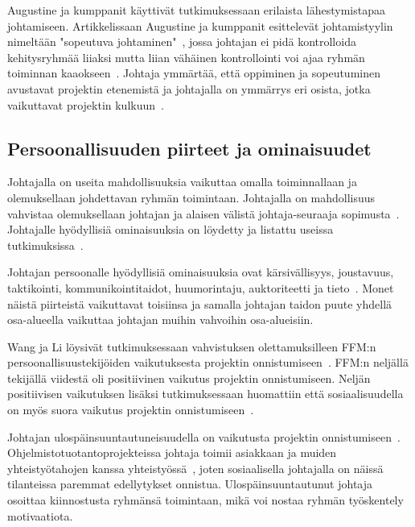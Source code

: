 \documentclass[finnish]{tktltiki2}
\theoremstyle{definition}
\theoremstyle{remark}
\begin{document}
Augustine ja kumppanit käyttivät tutkimuksessaan erilaista lä\-hes\-ty\-mis\-ta\-paa johtamiseen. Artikkelissaan Augustine ja kumppanit esittelevät johtamistyylin nimeltään "sopeutuva johtaminen"~\cite{Augustine:2005:APM:1101779.1101781}, jossa johtajan ei pidä kontrolloida kehitysryhmää liiaksi mutta liian vähäinen kontrollointi voi ajaa ryhmän toiminnan kaaokseen~\cite{Augustine:2005:APM:1101779.1101781}. Johtaja ymmärtää, että oppiminen ja sopeutuminen avustavat projektin etenemistä ja johtajalla on ymmärrys eri osista, jotka vaikuttavat projektin kulkuun~\cite{Augustine:2005:APM:1101779.1101781}. 





\subsection{Persoonallisuuden piirteet ja ominaisuudet}

Johtajalla on useita mahdollisuuksia vaikuttaa omalla toiminnallaan ja olemuksellaan johdettavan ryhmän toimintaan. Johtajalla on mahdollisuus vahvistaa olemuksellaan johtajan ja alaisen välistä johtaja-seuraaja sopimusta~\cite{raccoon2006leadership}. Johtajalle hyödyllisiä ominaisuuksia on löydetty ja listattu useissa tutkimuksissa~\cite{raccoon2006leadership, Wang:2009:PMP:1639950.1640049, bradley1997effect, 4017705}.

Johtajan persoonalle hyödyllisiä ominaisuuksia ovat kärsivällisyys, joustavuus, taktikointi, kommunikointitaidot, huumorintaju, auktoriteetti ja tieto~\cite{4017705}. Monet näistä piirteistä vaikuttavat toisiinsa ja samalla johtajan taidon puute yhdellä osa-alueella vaikuttaa johtajan muihin vahvoihin osa-alueisiin.

Wang ja Li löysivät tutkimuksessaan vahvistuksen olettamuksilleen FFM:n persoonallisuustekijöiden vaikutuksesta projektin onnistumiseen~\cite{Wang:2009:PMP:1639950.1640049}. FFM:n neljällä tekijällä viidestä oli positiivinen vaikutus projektin onnistumiseen. Neljän positiivisen vaikutuksen lisäksi tutkimuksessaan huomattiin että sosiaalisuudella on myös suora vaikutus projektin onnistumiseen~\cite{Wang:2009:PMP:1639950.1640049}.

Johtajan ulospäinsuuntautuneisuudella on vaikutusta projektin onnistumiseen~\cite{Wang:2009:PMP:1639950.1640049}. Ohjelmistotuotantoprojekteissa johtaja toimii asiakkaan ja muiden yhteistyötahojen kanssa yhteistyössä~\cite{McLeod:2011:FAS:1978802.1978803}, joten sosiaalisella johtajalla on näissä tilanteissa paremmat edellytykset onnistua. Ulospäinsuuntautunut johtaja osoittaa kiinnostusta ryhmänsä toimintaan, mikä voi nostaa ryhmän työskentely motivaatiota.
\end{document}
